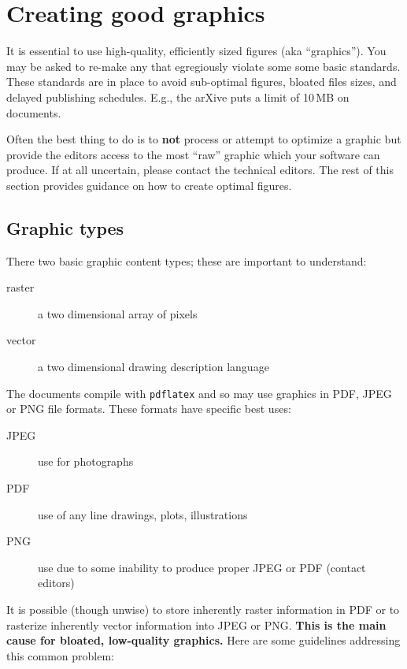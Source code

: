 \chapter{Creating good graphics}
\label{ch:graphics}


It is essential to use high-quality, efficiently sized figures (aka
``graphics'').
You may be asked to re-make any that egregiously violate some some
basic standards.
These standards are in place to avoid sub-optimal figures, bloated
files sizes, and delayed publishing schedules.  E.g., the arXive puts a limit of 10\,MB on documents.

Often the best thing to do is to \textbf{not} process or attempt to
optimize a graphic but provide the editors access to the most ``raw''
graphic which your software can produce.
If at all uncertain, please contact the technical editors.
The rest of this section provides guidance on how to create optimal
figures.

\section{Graphic types}
\label{sec:graphic-types}

There two basic graphic content types; these are important to understand:

\begin{description}
\item[raster] a two dimensional array of pixels
\item[vector] a two dimensional drawing description language
\end{description}

The documents compile with \texttt{pdflatex} and so may use graphics
in PDF, JPEG or PNG file formats.
These formats have specific best uses:

\begin{description}
\item[JPEG] use for photographs
\item[PDF] use of any line drawings, plots, illustrations
\item[PNG] use due to some inability to produce proper JPEG or PDF (contact editors)
\end{description}

It is possible (though unwise) to store inherently raster information
in PDF or to rasterize inherently vector information into JPEG or PNG.
\textbf{This is the main cause for bloated, low-quality graphics.}
Here are some guidelines addressing this common problem:

